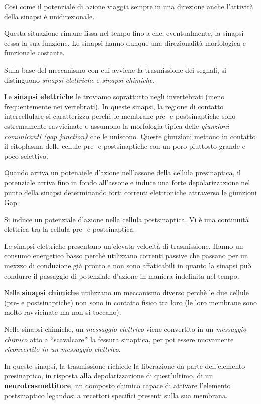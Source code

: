 \documentclass[]{article}
\begin{document}
Così come il potenziale di azione viaggia sempre in una direzione anche
l'attività della sinapsi è unidirezionale.

Questa situazione rimane fissa nel tempo fino a che, eventualmente, la
sinapsi cessa la sua funzione. Le sinapsi hanno dunque una direzionalità
morfologica e funzionale costante.

Sulla base del meccanismo con cui avviene la trasmissione dei segnali,
si distinguono \emph{sinapsi elettriche} e \emph{sinapsi chimiche}.

Le \textbf{sinapsi elettriche} le troviamo soprattutto negli
invertebrati (meno frequentemente nei vertebrati). In queste sinapsi, la
regione di contatto intercellulare si caratterizza perchè le membrane
pre- e postsinaptiche sono estremamente ravvicinate e assumono la
morfologia tipica delle \emph{giunzioni comunicanti (gap junction)} che
le uniscono. Queste giunzioni mettono in contatto il citoplasma delle
cellule pre- e postsinaptiche con un poro piuttosto grande e poco
selettivo.

Quando arriva un potenaiele d'azione nell'assone della cellula
presinaptica, il potenziale arriva fino in fondo all'assone e induce una
forte depolarizzazione nel punto della sinapsi determinando forti
correnti elettroniche attraverso le giunzioni Gap.

Si induce un potenziale d'azione nella cellula postsinaptica. Vi è una
continuità elettrica tra la cellula pre- e postsinaptica.

Le sinapsi elettriche presentano un'elevata velocità di trasmissione.
Hanno un consumo energetico basso perchè utilizzano correnti passive che
passano per un mexzzo di conduzione già pronto e non sono affaticabili
in quanto la sinapsi può condurre il passaggio di potenziale d'azione in
maniera indefinita nel tempo.

Nelle \textbf{sinapsi chimiche} utilizzano un meccanismo diverso perchè
le due cellule (pre- e postsinaptiche) non sono in contatto fisico tra
loro (le loro membrane sono molto ravvicinate ma non si toccano).

Nelle sinapsi chimiche, un \emph{messaggio elettrico} viene convertito
in un \emph{messaggio chimico} atto a ``scavalcare'' la fessura
sinaptica, per poi essere nuovamente \emph{riconvertito in un messaggio
elettrico}.

In queste sinapsi, la trasmissione richiede la liberazione da parte
dell'elemento presinaptico, in risposta alla depolarizzazione di
quest'ultimo, di un \textbf{neurotrasmettitore}, un composto chimico
capace di attivare l'elemento postsinaptico legandosi a recettori
specifici presenti sulla sua membrana.
\end{document}
